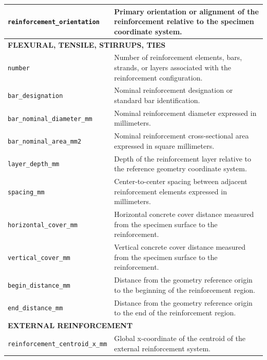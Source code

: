 \documentclass[11pt]{book}
\begin{document}
{\begin{longtable}{p{}p{}}
\texttt{reinforcement\_orientation} &
Primary orientation or alignment of the reinforcement relative to the specimen coordinate system. \\

\hline
\multicolumn{2}{l}{\textbf{FLEXURAL, TENSILE, STIRRUPS, TIES}}\\
\hline

\texttt{number} &
Number of reinforcement elements, bars, strands, or layers associated with the reinforcement configuration. \\

\texttt{bar\_designation} &
Nominal reinforcement designation or standard bar identification. \\

\texttt{bar\_nominal\_diameter\_mm} &
Nominal reinforcement diameter expressed in millimeters. \\

\texttt{bar\_nominal\_area\_mm2} &
Nominal reinforcement cross-sectional area expressed in square millimeters. \\

\texttt{layer\_depth\_mm} &
Depth of the reinforcement layer relative to the reference geometry coordinate system. \\

\texttt{spacing\_mm} &
Center-to-center spacing between adjacent reinforcement elements expressed in millimeters. \\

\texttt{horizontal\_cover\_mm} &
Horizontal concrete cover distance measured from the specimen surface to the reinforcement. \\

\texttt{vertical\_cover\_mm} &
Vertical concrete cover distance measured from the specimen surface to the reinforcement. \\

\texttt{begin\_distance\_mm} &
Distance from the geometry reference origin to the beginning of the reinforcement region. \\

\texttt{end\_distance\_mm} &
Distance from the geometry reference origin to the end of the reinforcement region. \\

\hline
\multicolumn{2}{l}{\textbf{EXTERNAL REINFORCEMENT}}\\
\hline

\texttt{reinforcement\_centroid\_x\_mm} &
Global x-coordinate of the centroid of the external reinforcement system. \\


\end{longtable}}
\end{document}
